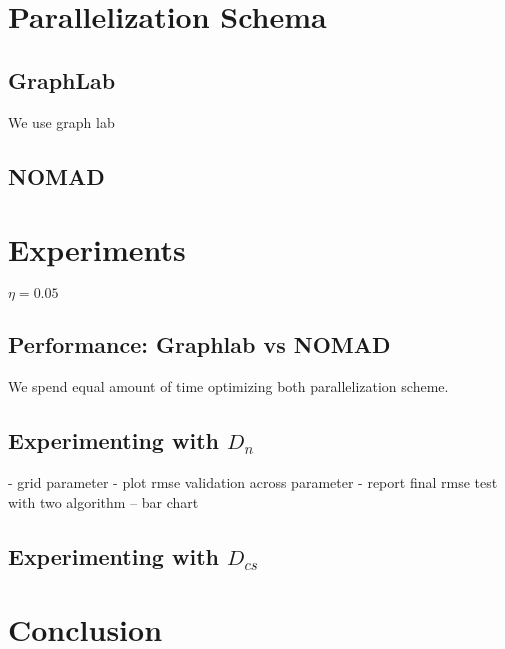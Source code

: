 \documentclass{article} %
\begin{document}
\section{Parallelization Schema}

	\subsection{GraphLab}

	We use graph lab

	\subsection{NOMAD}

\section{Experiments}

	$\eta=0.05$

	\subsection{Performance: Graphlab vs NOMAD}

	We spend equal amount of time optimizing both parallelization scheme.

	\subsection{Experimenting with $D_n$}

	- grid parameter
	- plot rmse validation across parameter
	- report final rmse test with two algorithm -- bar chart

	\subsection{Experimenting with $D_{cs}$}


	\section{Conclusion}


	
	{}
\end{document}
